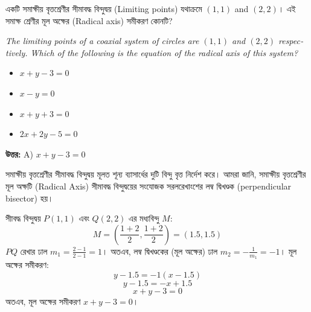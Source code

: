 \documentclass[12pt, a4paper]{article}
\begin{document}
\begin{tcolorbox}[questionbox={প্রশ্ন (Question) 11}]
    \noindent
    একটি সমাক্ষীয় বৃত্তশ্রেণীর সীমাবদ্ধ বিন্দুদ্বয় (Limiting points) যথাক্রমে $(1, 1)$ and $(2, 2)$। এই সমাক্ষ শ্রেণীর মূল অক্ষের (Radical axis) সমীকরণ কোনটি?
    
    \vspace{0.8em}
    \begin{english}
    \noindent\textit{\color{darkgray}
    The limiting points of a coaxial system of circles are $(1, 1)$ and $(2, 2)$ respectively. Which of the following is the equation of the radical axis of this system?
    }
    \end{english}
\end{tcolorbox}

\begin{itemize}[label={}, leftmargin=1cm, itemsep=0.5em]
    \item[\textbf{A)}] $x + y - 3 = 0$
    \item[\textbf{B)}] $x - y = 0$
    \item[\textbf{C)}] $x + y + 3 = 0$
    \item[\textbf{D)}] $2x + 2y - 5 = 0$
\end{itemize}

\vspace{0.5em}
\begin{tcolorbox}[answerbox]
    \textbf{\color{success} উত্তর:} A) $x + y - 3 = 0$
\end{tcolorbox}
\vspace{1em}

\begin{tcolorbox}[solutionbox={সমাধান (Solution)}]
    \noindent
    সমাক্ষীয় বৃত্তশ্রেণীর সীমাবদ্ধ বিন্দুদ্বয় মূলত শূন্য ব্যাসার্ধের দুটি বিন্দু বৃত্ত নির্দেশ করে। আমরা জানি, সমাক্ষীয় বৃত্তশ্রেণীর মূল অক্ষটি (Radical Axis) সীমাবদ্ধ বিন্দুদ্বয়ের সংযোজক সরলরেখাংশের লম্ব দ্বিখণ্ডক (perpendicular bisector) হয়। 
    
    \vspace{0.5em}
    সীাবদ্ধ বিন্দুদ্বয় $P(1, 1)$ এবং $Q(2, 2)$ এর মধ্যবিন্দু $M$:
    \[ M = \left(\frac{1+2}{2}, \frac{1+2}{2}\right) = (1.5, 1.5) \]
    $PQ$ রেখার ঢাল $m_1 = \frac{2 - 1}{2 - 1} = 1$। অতএব, লম্ব দ্বিখণ্ডকের (মূল অক্ষের) ঢাল $m_2 = -\frac{1}{m_1} = -1$।
    মূল অক্ষের সমীকরণ:
    \[ y - 1.5 = -1(x - 1.5) \]
    \[ y - 1.5 = -x + 1.5 \]
    \[ x + y - 3 = 0 \]
    অতএব, মূল অক্ষের সমীকরণ $x + y - 3 = 0$।
\end{tcolorbox}
\end{document}
